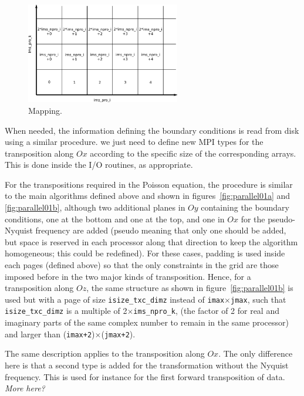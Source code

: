 \begin{figure}[!ht]
\begin{centering}
\includegraphics[width=0.6\textwidth]{figs/parallel02.png}
\caption{Mapping.}
\label{fig:parallel02}
\end{centering}
\end{figure}

When needed, the information defining the boundary conditions is read from disk
using a similar procedure. we just need to define new MPI types for the
transposition along $Ox$ according to the specific size of the corresponding
arrays. This is done inside the I/O routines, as appropriate.

For the transpositions required in the Poisson equation, the procedure is
similar to the main algorithms defined above and shown in
figures~\ref{fig:parallel01a} and \ref{fig:parallel01b}, although two additional
planes in $Oy$ containing the boundary conditions, one at the bottom and one at
the top, and one in $Ox$ for the pseudo-Nyquist frequency are added (pseudo
meaning that only one should be added, but space is reserved in each processor
along that direction to keep the algorithm homogeneous; this could be
redefined). For these cases, padding is used inside each pages (defined above)
so that the only constraints in the grid are those imposed before in the two
major kinds of transposition. Hence, for a transposition along $Oz$, the same
structure as shown in figure~\ref{fig:parallel01b} is used but with a page of
size {\tt isize\_txc\_dimz} instead of {\tt imax}$\times${\tt jmax}, such that
{\tt isize\_txc\_dimz} is a multiple of 2$\times${\tt ims\_npro\_k}, (the factor
of 2 for real and imaginary parts of the same complex number to remain in the
same processor) and larger than ({\tt imax+2})$\times$({\tt jmax+2}). 

The same description applies to the transposition along $Ox$. The only
difference here is that a second type is added for the transformation without
the Nyquist frequency. This is used for instance for the first forward
transposition of data. {\em More here?}
